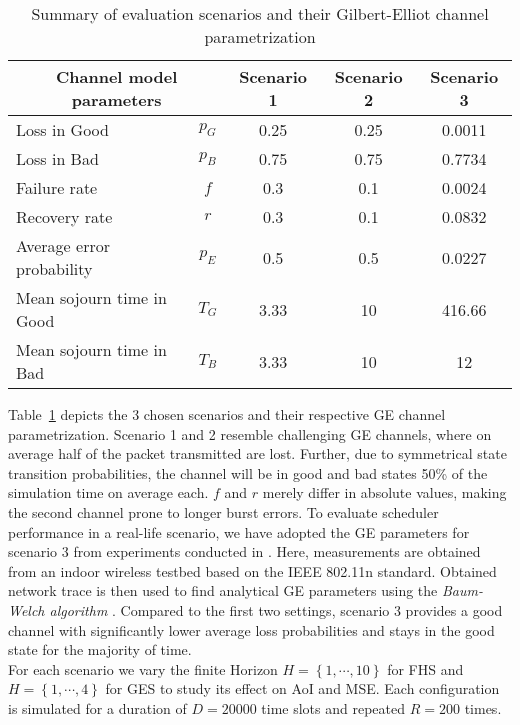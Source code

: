 \begin{table}[htb]
  \begin{center}
  \begin{tabular}{|lc|c|c|c|} 
  \hline
  \multicolumn{2}{|c|}{\textbf{Channel model parameters}} & \textbf{Scenario 1} & \textbf{Scenario 2} & \textbf{Scenario 3} \\
  \hline \hline
  Loss in Good & $p_G$ & 0.25 & 0.25 & 0.0011 \\ 
  Loss in Bad & $p_B$ & 0.75 & 0.75 &  0.7734 \\ 
  Failure rate & $f$ & 0.3 & 0.1 & 0.0024 \\ 
  Recovery rate & $r$ & 0.3 & 0.1 & 0.0832 \\
  \hline
  Average error probability & $p_E$ & 0.5 & 0.5 & 0.0227 \\
  Mean sojourn time in Good & $T_G$ & 3.33 & 10 & 416.66 \\
  Mean sojourn time in Bad & $T_B$ & 3.33 & 10 & 12 \\
  \hline
  \end{tabular}
  \end{center}
  \caption{Summary of evaluation scenarios and their Gilbert-Elliot channel parametrization}
  \label{tab:scenarios}
\end{table}

Table~\ref{tab:scenarios} depicts the 3 chosen scenarios and their respective GE
channel parametrization. Scenario 1 and 2 resemble challenging GE channels,
where on average half of the packet transmitted are lost. Further, due to
symmetrical state transition probabilities, the channel will be in good and bad
states 50\% of the simulation time on average each. $f$ and $r$ merely differ in
absolute values, making the second channel prone to longer burst errors. To
evaluate scheduler performance in a real-life scenario, we have adopted the GE
parameters for scenario 3 from experiments conducted in
\cite{frohn2011analyzing}. Here, measurements are obtained from an indoor
wireless testbed based on the IEEE 802.11n standard. Obtained network trace is
then used to find analytical GE parameters using the \textit{Baum-Welch
algorithm} \cite{baum1970maximization}. Compared to the first two settings,
scenario 3 provides a good channel with significantly lower average loss
probabilities and stays in the good state for the majority of time. \\ 
For each scenario we vary the finite Horizon $H=\left\{ 1, \cdots, 10\right\}$
for FHS and $H=\left\{ 1, \cdots, 4\right\}$ for GES to study its effect on AoI
and MSE. Each configuration is simulated for a duration of $D=20000$ time slots
and repeated $R=200$ times.

